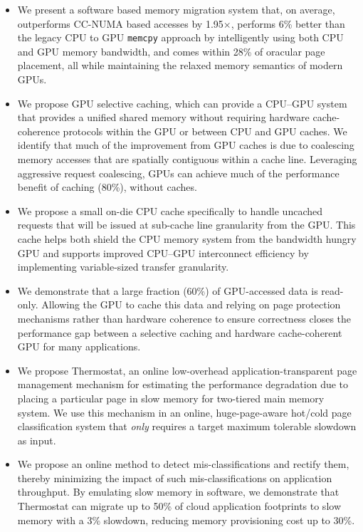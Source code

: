 \begin{itemize}

\item 
We present a software based memory migration system that, on average,
outperforms CC-NUMA based accesses by 1.95$\times$, performs 6\% better than the
legacy CPU to GPU {\tt memcpy} approach by intelligently using both CPU and GPU
memory bandwidth, and comes within 28\% of oracular page placement, all while
maintaining the relaxed memory semantics of modern GPUs.

\item
We propose GPU selective caching, which can provide a CPU--GPU system that
provides a unified shared memory without requiring hardware cache-coherence
protocols within the GPU or between CPU and GPU caches.
We identify that much of the improvement from GPU caches is due to coalescing 
memory accesses that are spatially contiguous within a cache line.  Leveraging
aggressive request coalescing, GPUs can achieve much of the performance benefit
of caching (80\%), without caches.

\item
We propose a small on-die CPU cache specifically to handle uncached requests
that will be issued at sub-cache line granularity from the GPU. This cache helps
both shield the CPU memory system from the bandwidth hungry GPU and supports
improved CPU--GPU interconnect efficiency by implementing variable-sized
transfer granularity.

\item
We demonstrate that a large fraction (60\%) of GPU-accessed data is read-only.
Allowing the GPU to cache this data and relying on page protection mechanisms
rather than hardware coherence to ensure correctness closes the performance gap
between a selective caching and hardware cache-coherent GPU for many
applications.

\item
We propose Thermostat, an online low-overhead application-transparent page
management mechanism for estimating the performance degradation due to placing a
particular page in slow memory for two-tiered main memory system.  We use this
mechanism in an online, huge-page-aware hot/cold page classification system that
{\it only} requires a target maximum tolerable slowdown as input.

\item
We propose an online method to detect mis-classifications and rectify them,
thereby minimizing the impact of such mis-classifications on application
throughput.  By emulating slow memory in software, we demonstrate that
Thermostat can migrate up to 50\% of cloud application footprints to slow memory
with a 3\% slowdown, reducing memory provisioning cost up to 30\%.
\end{itemize}

